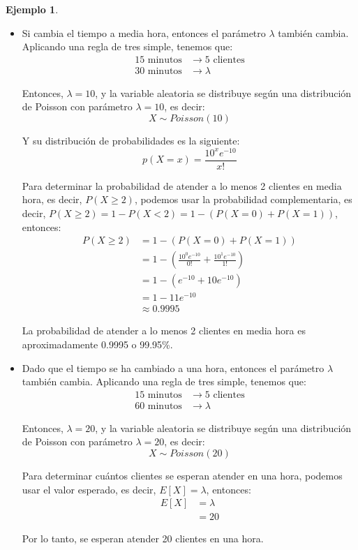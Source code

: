 \documentclass{article}
\theoremstyle{definition}
\newtheorem{example}[definition]{Ejemplo}
\theoremstyle{plain}
\theoremstyle{remark}
\begin{document}
\begin{example}
\begin{itemize}
\item Si cambia el tiempo a media hora, entonces el parámetro $\lambda$ también cambia. Aplicando una regla de tres simple, tenemos que:
\begin{align*}
15 \text{ minutos} &\rightarrow 5 \text{ clientes} \\
30 \text{ minutos} &\rightarrow \lambda
\end{align*}

Entonces, $\lambda = 10$, y la variable aleatoria se distribuye según una distribución de Poisson con parámetro $\lambda = 10$, es decir:
\[
X \sim Poisson(10)
\]

Y su distribución de probabilidades es la siguiente:
\[
p(X = x) = \frac{10^x e^{-10}}{x!}
\]

Para determinar la probabilidad de atender a lo menos 2 clientes en media hora, es decir, $P(X \geq 2)$, podemos usar la probabilidad complementaria, es decir, $P(X \geq 2) = 1 - P(X < 2) = 1 - (P(X = 0) + P(X = 1))$, entonces:
\begin{align*}
P(X \geq 2) &= 1 - (P(X = 0) + P(X = 1)) \\
&= 1 - \left( \frac{10^0 e^{-10}}{0!} + \frac{10^1 e^{-10}}{1!} \right) \\
&= 1 - \left( e^{-10} + 10 e^{-10} \right) \\
&= 1 - 11 e^{-10} \\
&\approx 0.9995
\end{align*}

La probabilidad de atender a lo menos 2 clientes en media hora es aproximadamente 0.9995 o 99.95\%.

\item Dado que el tiempo se ha cambiado a una hora, entonces el parámetro $\lambda$ también cambia. Aplicando una regla de tres simple, tenemos que:
\begin{align*}
15 \text{ minutos} &\rightarrow 5 \text{ clientes} \\
60 \text{ minutos} &\rightarrow \lambda
\end{align*}

Entonces, $\lambda = 20$, y la variable aleatoria se distribuye según una distribución de Poisson con parámetro $\lambda = 20$, es decir:
\[
X \sim Poisson(20)
\]

Para determinar cuántos clientes se esperan atender en una hora, podemos usar el valor esperado, es decir, $E[X] = \lambda$, entonces:
\begin{align*}
E[X] &= \lambda \\
&= 20
\end{align*}

Por lo tanto, se esperan atender 20 clientes en una hora.

\end{itemize}

\end{example}
\end{document}
